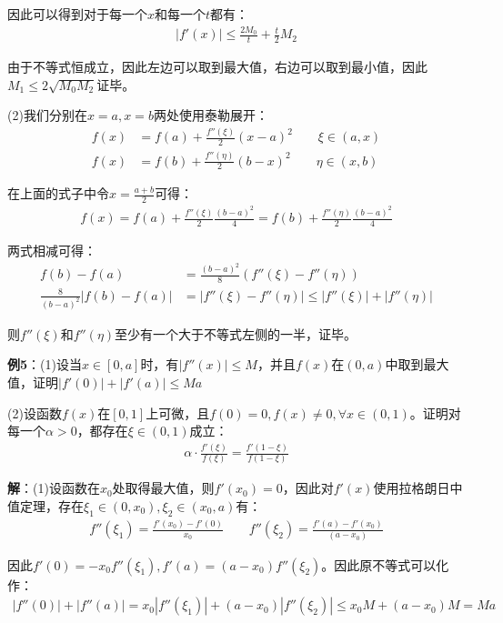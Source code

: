 \documentclass{ctexart}
\let\oldtextbf\textbf %
\renewcommand{\textbf}[1]{\textcolor{btex}{\oldtextbf{#1}}} %
\begin{document}
因此可以得到对于每一个$x$和每一个$t$都有：
\begin{align*}
    |f'(x)|\leq \frac{2M_0}{t}+\frac{t}{2}M_2
\end{align*}

由于不等式恒成立，因此左边可以取到最大值，右边可以取到最小值，因此$M_1\leq 2\sqrt{M_0M_2}$证毕。

(2)我们分别在$x=a,x=b$两处使用泰勒展开：
\begin{align*}
    f(x)&=f(a)+\frac{f''(\xi)}{2}(x-a)^2\qquad \xi\in(a,x)\\
    f(x)&=f(b)+\frac{f''(\eta)}{2}(b-x)^2\qquad  \eta\in(x,b)
\end{align*}

在上面的式子中令$x=\frac{a+b}{2}$可得：
\begin{align*}
 f(x)=f(a)+\frac{f''(\xi)}{2}\frac{(b-a)^2}{4}
=f(b)+\frac{f''(\eta)}{2}\frac{(b-a)^2}{4}
\end{align*}

两式相减可得：
\begin{align*}
f(b)-f(a)&=\frac{(b-a)^2}{8} (f''(\xi)-f''(\eta))\\
\frac{8}{(b-a)^2} |f(b)-f(a)|&=|f''(\xi)-f''(\eta)|\leq|f''(\xi)|+|f''(\eta)|
\end{align*}

则$f''(\xi)$和$f''(\eta)$至少有一个大于不等式左侧的一半，证毕。

\textbf{例5}：(1)设当$x\in[0,a]$时，有$|f''(x)|\leq M$，并且$f(x)$在$(0,a)$中取到最大值，证明$|f'(0)|+|f'(a)|\leq Ma$

(2)设函数$f(x)$在$[0,1]$上可微，且$f(0)=0,f(x)\neq 0,\forall x\in(0,1)$。证明对每一个$\alpha>0$，都存在$\xi\in(0,1)$成立：
\begin{align*}
    \alpha\cdot\frac{f'(\xi)}{f(\xi)}=\frac{f'(1-\xi)}{f(1-\xi)}
\end{align*}

\textbf{解}：(1)设函数在$x_0$处取得最大值，则$f'(x_0)=0$，因此对$f'(x)$使用拉格朗日中值定理，存在$\xi_1\in(0,x_0),\xi_2\in(x_0,a)$有：
\begin{align*}
    f''(\xi_1)=\frac{f'(x_0)-f'(0)}{x_0}\qquad f''(\xi_2)=\frac{f'(a)-f'(x_0)}{(a-x_0)}
\end{align*}

因此$f'(0)=-x_0f''(\xi_1),f'(a)=(a-x_0)f''(\xi_2)$。因此原不等式可以化作：
\begin{align*}
    |f''(0)|+|f''(a)|=x_0|f''(\xi_1)|+(a-x_0)|f''(\xi_2)|\leq x_0M+(a-x_0)M=Ma
\end{align*}
\end{document}
